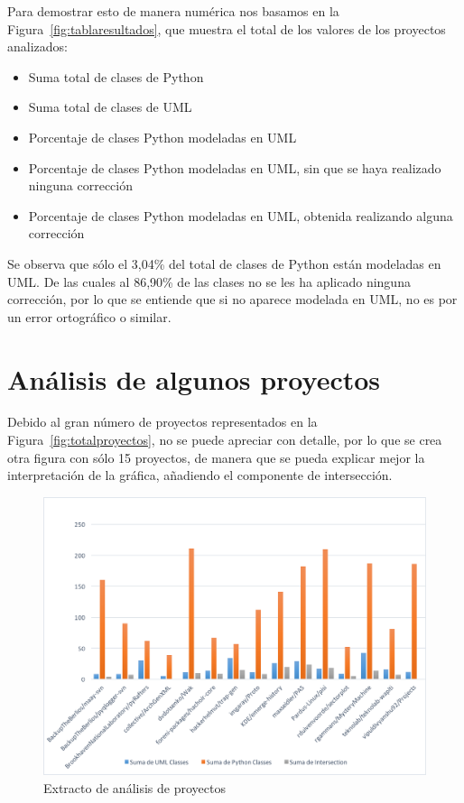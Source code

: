 \documentclass[a4paper, 12pt]{book}
\begin{document}
Para demostrar esto de manera numérica nos basamos en la Figura~\ref{fig:tablaresultados}, que muestra el total de los valores de los proyectos analizados:

\begin{itemize}
  \item Suma total de clases de Python
  \item Suma total de clases de UML
  \item Porcentaje de clases Python modeladas en UML
  \item Porcentaje de clases Python modeladas en UML, sin que se haya realizado ninguna corrección
  \item Porcentaje de clases Python modeladas en UML, obtenida realizando alguna corrección
\end{itemize}

Se observa que sólo el 3,04\% del total de clases de Python están modeladas en UML. De las cuales
al 86,90\% de las clases no se les ha aplicado ninguna corrección, por lo que se entiende que si no
aparece modelada en UML, no es por un error ortográfico o similar.

\section{Análisis de algunos proyectos}
\label{subsec:analisisalgunosproyectos}
Debido al gran número de proyectos representados en la Figura~\ref{fig:totalproyectos}, no se puede
apreciar con detalle, por lo que se crea otra figura con sólo 15 proyectos, de manera que se pueda
explicar mejor la interpretación de la gráfica, añadiendo el componente de intersección.

\begin{figure}[htb]
  \centering
  \includegraphics[width=\textwidth, keepaspectratio]{img/GraficasResultados/extracto}
  \caption{Extracto de análisis de proyectos}
  \label{fig:extracto}
\end{figure}
\end{document}
